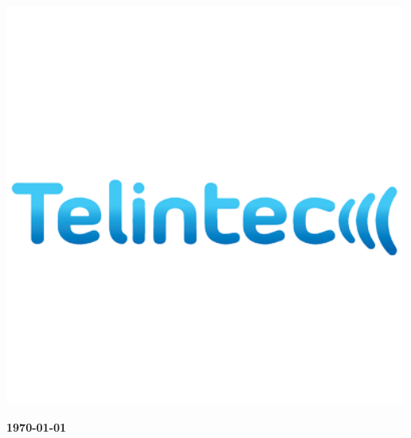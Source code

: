 \pagestyle{empty}
\begin{titlepage}
    \begin{center}
        \includegraphics[width=0.9\linewidth]{telintec-500.png}
        \par{\vspace{1.5cm}{
        \Large{
            \textbf{\thetitle}}
            }}
    \end{center}
    \vspace{0.5cm}        
    \centering \Large\textbf{\today }
\end{titlepage}